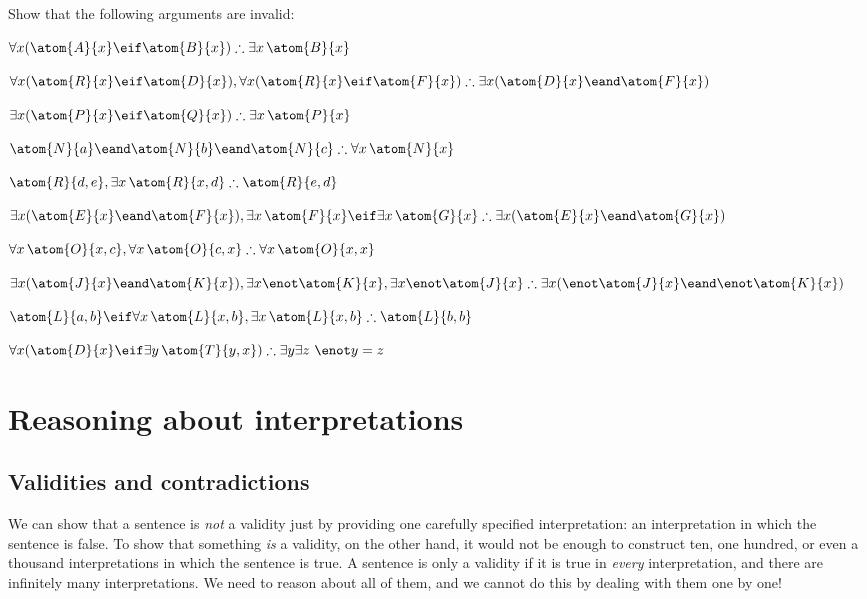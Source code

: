 \problempart
Show that the following arguments are invalid:
\begin{earg}
\item $\forall x(\atom{A}{x} \eif \atom{B}{x}) \therefore \exists x\, \atom{B}{x}$
\item $\forall x(\atom{R}{x} \eif \atom{D}{x}), \forall x(\atom{R}{x} \eif \atom{F}{x}) \therefore \exists x(\atom{D}{x} \eand \atom{F}{x})$
\item $\exists x(\atom{P}{x}\eif \atom{Q}{x}) \therefore \exists x\, \atom{P}{x}$
\item $\atom{N}{a} \eand \atom{N}{b} \eand \atom{N}{c} \therefore \forall x\, \atom{N}{x}$
\item $\atom{R}{d,e}, \exists x\, \atom{R}{x,d} \therefore \atom{R}{e,d}$
\item $\exists x(\atom{E}{x} \eand \atom{F}{x}), \exists x\, \atom{F}{x} \eif \exists x\, \atom{G}{x} \therefore \exists x(\atom{E}{x} \eand \atom{G}{x})$
\item $\forall x\, \atom{O}{x,c}, \forall x\, \atom{O}{c,x} \therefore \forall x\, \atom{O}{x,x}$
\item $\exists x(\atom{J}{x} \eand \atom{K}{x}), \exists x \enot \atom{K}{x}, \exists x \enot \atom{J}{x} \therefore \exists x(\enot \atom{J}{x} \eand \enot \atom{K}{x})$
\item $\atom{L}{a,b} \eif \forall x\, \atom{L}{x,b}, \exists x\, \atom{L}{x,b} \therefore \atom{L}{b,b}$
\item $\forall x(\atom{D}{x} \eif \exists y\, \atom{T}{y,x}) \therefore \exists y \exists z\ \enot y= z$
\end{earg}

\chapter{Reasoning about interpretations}

\section{Validities and contradictions}
We can show that a sentence is \emph{not} a validity just by providing one carefully specified interpretation: an interpretation in which the sentence is false. To show that something \emph{is} a validity, on the other hand, it would not be enough to construct ten, one hundred, or even a thousand interpretations in which the sentence is true. A sentence is only a validity if it is true in \emph{every} interpretation, and there are infinitely many interpretations. We need to reason about all of them, and we cannot do this by dealing with them one by one!

